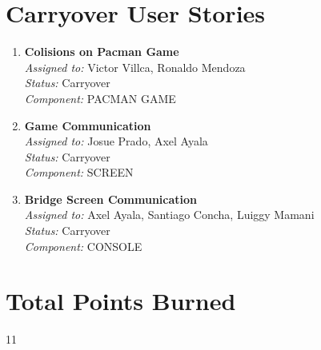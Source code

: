 \documentclass{article}
\begin{document}
    \section*{Carryover User Stories}

    \begin{enumerate}
        \item \textbf{Colisions on Pacman Game} \\
        \textit{Assigned to:} Victor Villca, Ronaldo Mendoza \\
        \textit{Status:} Carryover \\
        \textit{Component:} PACMAN GAME
        \item \textbf{Game Communication} \\
        \textit{Assigned to:} Josue Prado, Axel Ayala \\
        \textit{Status:} Carryover \\
        \textit{Component:} SCREEN
        \item \textbf{Bridge Screen Communication } \\
        \textit{Assigned to:} Axel Ayala, Santiago Concha, Luiggy Mamani \\
        \textit{Status:} Carryover \\
        \textit{Component:} CONSOLE
    \end{enumerate}

    \section*{Total Points Burned}
    11
\end{document}
